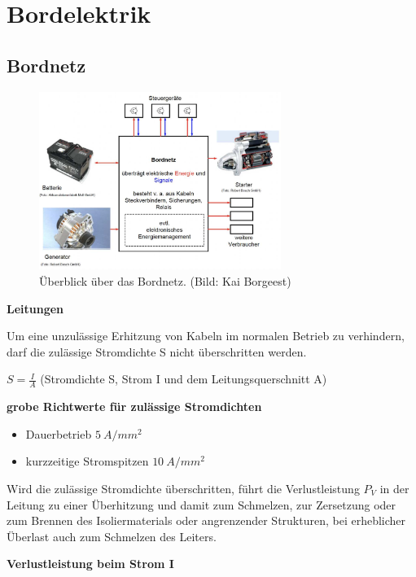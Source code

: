\section{Bordelektrik}\label{bordelektrik}

\subsection{Bordnetz}\label{bordnetz}

\begin{figure}[!ht]%
\centering
\includegraphics[width=0.7\textwidth]{images/CAN/CAN-1.pdf}
\caption{Überblick über das Bordnetz. (Bild: Kai Borgeest)}
\end{figure}

\textbf{Leitungen}

Um eine unzulässige Erhitzung von Kabeln im normalen Betrieb zu
verhindern, darf die zulässige Stromdichte S nicht überschritten werden.

$S = \frac{I}{A}$ (Stromdichte S, Strom I und dem Leitungsquerschnitt
A)

\textbf{grobe Richtwerte für zulässige Stromdichten}

\begin{itemize}
\item
  Dauerbetrieb $5~A/mm^2$
\item
  kurzzeitige Stromspitzen $10~A/mm^2$
\end{itemize}

Wird die zulässige Stromdichte überschritten, führt die Verlustleistung
$P_V$ in der Leitung zu einer Überhitzung und damit zum Schmelzen, zur
Zersetzung oder zum Brennen des Isoliermaterials oder angrenzender
Strukturen, bei erheblicher Überlast auch zum Schmelzen des Leiters.

\textbf{Verlustleistung beim Strom I}

